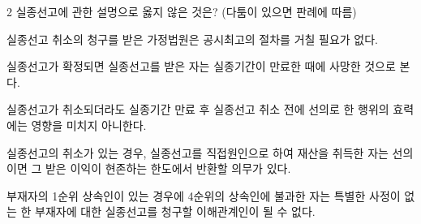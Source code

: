 \begin{question}{2}
실종선고에 관한 설명으로 옳지 않은 것은? (다툼이 있으면 판례에 따름)
\begin{choices}
  \item 실종선고 취소의 청구를 받은 가정법원은 공시최고의 절차를 거칠 필요가 없다.
  \item 실종선고가 확정되면 실종선고를 받은 자는 실종기간이 만료한 때에 사망한 것으로 본다.
  \item 실종선고가 취소되더라도 실종기간 만료 후 실종선고 취소 전에 선의로 한 행위의 효력에는 영향을 미치지 아니한다.
  \item 실종선고의 취소가 있는 경우, 실종선고를 직접원인으로 하여 재산을 취득한 자는 선의이면 그 받은 이익이 현존하는 한도에서 반환할 의무가 있다.
  \item 부재자의 1순위 상속인이 있는 경우에 4순위의 상속인에 불과한 자는 특별한 사정이 없는 한 부재자에 대한 실종선고를 청구할 이해관계인이 될 수 없다.
\end{choices}
\end{question}
